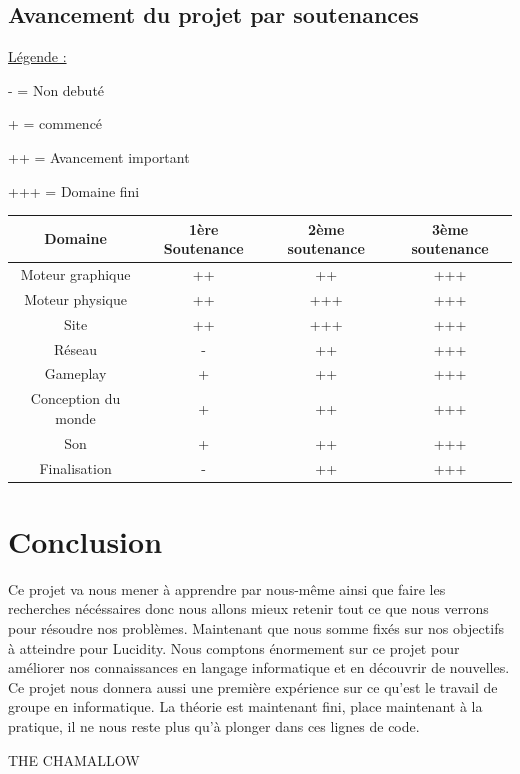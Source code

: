 \documentclass[a4paper]{article}
\begin{document}
	\subsection{Avancement du projet par soutenances}

\underline{Légende :} 

\quad
- = Non debuté

 \quad
+ = commencé 

\quad
++ = Avancement important 

\quad
+++ = Domaine fini

 \quad

			\begin{tabular}{|c|c|c|c|}
\hline Domaine & 1ère Soutenance & 2ème soutenance & 3ème soutenance \\
\hline Moteur graphique & ++ & ++ & +++\\
\hline Moteur physique & ++ & +++ & +++\\
\hline Site & ++ & +++ & +++\\
\hline Réseau & - & ++ & +++\\
\hline Gameplay & + & ++ & +++\\
\hline Conception du monde & + & ++ & +++\\
\hline Son & + & ++ & +++\\
\hline Finalisation & - & ++ & +++ \\
\hline
			\end {tabular}

\newpage
\section{Conclusion}


Ce projet va nous mener à apprendre par nous-même ainsi que faire les recherches nécéssaires donc nous allons mieux retenir tout ce que nous verrons pour résoudre nos problèmes.
Maintenant que nous somme fixés sur nos objectifs à atteindre pour Lucidity. 
Nous comptons énormement sur ce projet pour améliorer nos connaissances en langage informatique et en découvrir de nouvelles.
Ce projet nous donnera aussi une première expérience sur ce qu'est le travail de groupe en informatique.
La théorie est maintenant fini, place maintenant à la pratique, il ne nous reste plus qu’à plonger dans ces lignes de code.

\quad

\centering
\LARGE 

THE CHAMALLOW
\end{document}
